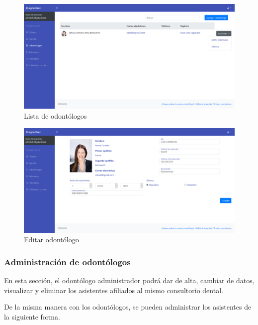 \begin{figure}[H]
\centering
\includegraphics[width=17cm,keepaspectratio]{pictures/adminodo/odontologos/lista-odontologos-3.png}
\caption{Lista de odontólogos}
\end{figure}

\begin{figure}[H]
\centering
\includegraphics[width=17cm,keepaspectratio]{pictures/adminodo/odontologos/editar-odo.png}
\caption{Editar odontólogo}
\end{figure}


\subsubsection{Administración de odontólogos}

En esta sección, el odontólogo administrador podrá dar de alta, cambiar de datos, visualizar y eliminar los asistentes afiliados al mismo consultorio dental.

\vspace{1em}

De la misma manera con los odontólogos, se pueden administrar los asistentes de la siguiente forma.

